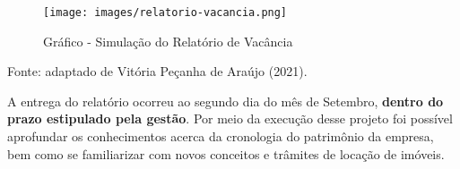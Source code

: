 \documentclass[a4paper,10pt,titlepage]{article}
\begin{document}
\begin{figure}[ht]\caption{Gráfico - Simulação do Relatório de Vacância}
    \centering
        \texttt{[image: images/relatorio-vacancia.png]}
        \label{figure:grafico-vacancia}
\end{figure}
    \begin{small}
        Fonte: adaptado de Vitória Peçanha de Araújo (2021).\\
    \end{small}
    
\begin{large}
    \begin{justify}
        \begin{onehalfspace}
            \noindent A entrega do relatório ocorreu ao segundo dia do mês de Setembro, \textbf{dentro do prazo estipulado pela gestão}. Por meio da execução desse projeto foi possível aprofundar os conhecimentos acerca da cronologia do patrimônio da empresa, bem como se familiarizar com novos conceitos e trâmites de locação de imóveis.\vfill
        \end{onehalfspace}
    \end{justify}
\end{large}
\end{document}
